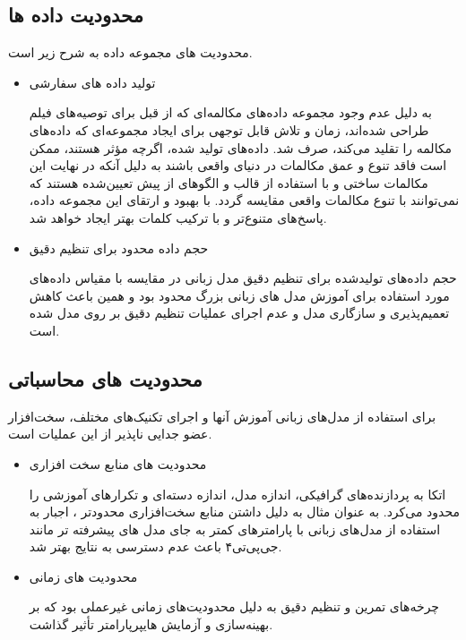 \subsection{محدودیت داده ها}
محدودیت های مجموعه داده به شرح زیر است.
\begin{itemize}
\item
 تولید داده های سفارشی

به دلیل عدم وجود مجموعه داده‌های مکالمه‌ای که از قبل برای توصیه‌های فیلم طراحی شده‌اند، زمان و تلاش قابل توجهی برای ایجاد مجموعه‌ای که داده‌های مکالمه را تقلید می‌کند، صرف شد. داده‌های تولید شده، اگرچه مؤثر هستند، ممکن است فاقد تنوع و عمق مکالمات در دنیای واقعی باشند به دلیل آنکه در نهایت این مکالمات ساختی و با استفاده از قالب و الگوهای از پیش تعیین‌شده هستند که نمی‌توانند با تنوع مکالمات واقعی مقایسه گردد. با بهبود و ارتقای این مجموعه داده، پاسخ‌های متنوع‌تر و با ترکیب کلمات بهتر ایجاد خواهد شد.

\item
 حجم داده محدود برای تنظیم دقیق

حجم داده‌های تولیدشده برای تنظیم دقیق مدل زبانی در مقایسه با مقیاس داده‌های مورد استفاده برای آموزش مدل های زبانی بزرگ محدود بود و همین باعث کاهش تعمیم‌پذیری و سازگاری مدل و عدم اجرای عملیات تنظیم دقیق بر روی مدل شده است.
\end{itemize}

\subsection{محدودیت های محاسباتی}
برای استفاده از مدل‌های زبانی آموزش آنها و اجرای تکنیک‌های مختلف، سخت‌افزار عضو جدایی ناپذیر از این عملیات است. 

\begin{itemize}
\item
محدودیت های منابع سخت افزاری

 اتکا به پردازنده‌های گرافیکی، اندازه مدل، اندازه دسته‌ای و تکرارهای آموزشی را محدود می‌کرد. به عنوان مثال به دلیل داشتن منابع سخت‌افزاری محدودتر ، اجبار به استفاده از مدل‌های زبانی با پارامترهای کمتر به جای مدل های پیشرفته تر مانند جی‌پی‌تی۴ باعث عدم دسترسی به نتایج بهتر شد.

\item
 محدودیت های زمانی

 چرخه‌های تمرین و تنظیم دقیق به دلیل محدودیت‌های زمانی غیرعملی بود که بر بهینه‌سازی و آزمایش هایپرپارامتر تأثیر گذاشت.
\end{itemize}


